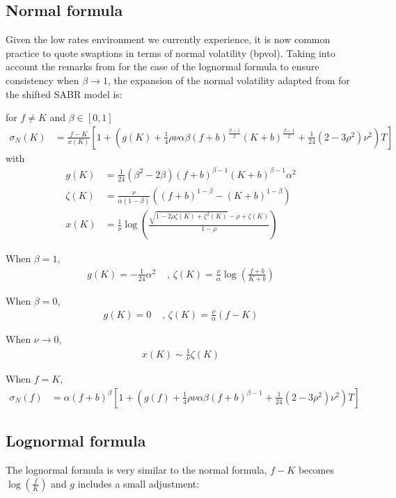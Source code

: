 \documentclass[]{rAMF2e}
\begin{document}
\subsection{Normal formula}
Given the low rates environment we currently experience, it is now common practice to quote swaptions in terms of normal volatility (bpvol). Taking into account the remarks from \citet{obloj2008fine} for the case of the lognormal formula to ensure consistency when $\beta \to 1$, the expansion of the normal volatility adapted from \citet{hagan2002managing} for the shifted SABR model is:

for $f \neq K$ and $\beta \in [0,1]$
\begin{align}
\label{eqn:normal_sabr}
\sigma_N(K) &= \frac{f-K}{x(K)}\left[1+\left(g(K)+\frac{1}{4}\rho\nu\alpha\beta(f+b)^{\frac{\beta-1}{2}}(K+b)^{\frac{\beta-1}{2}}+\frac{1}{24}(2-3\rho^2)\nu^2\right)T\right]
\end{align}
with 
\begin{align*}
g(K) &= \frac{1}{24} (\beta^2-2\beta) (f+b)^{\beta-1} (K+b)^{\beta-1} \alpha^2\\
\zeta(K) &= \frac{\nu}{\alpha (1-\beta)} \left( (f+b)^{1-\beta} - (K+b)^{1-\beta} \right)\\
x(K) &= \frac{1}{\nu}\log\left(\frac{\sqrt{1-2\rho\zeta(K)+\zeta^2(K)}-\rho+\zeta(K)}{1-\rho} \right)
\end{align*}

When $\beta = 1$,
\begin{align*}
g(K) = -\frac{1}{24}\alpha^2 &\texttt{ , } \zeta(K) = \frac{\nu}{\alpha} \log\left(\frac{f+b}{K+b}\right)
\end{align*}

When $\beta = 0$,
\begin{align*}
g(K) = 0 &\texttt{ , }\zeta(K) = \frac{\nu}{\alpha} \left(f-K\right)
\end{align*}

When $\nu \to 0$,
\begin{align*}
x(K) \sim \frac{1}{\nu}\zeta(K)
\end{align*}

When $f=K$, 
\begin{align}
\sigma_N(f) &= \alpha (f+b)^\beta \left[1+\left(g(f)+\frac{1}{4}\rho\nu\alpha\beta(f+b)^{\beta-1}+\frac{1}{24}(2-3\rho^2)\nu^2\right)T\right]
\end{align}
\subsection{Lognormal formula}
The lognormal formula is very similar to the normal formula, $f-K$ becomes $\log(\frac{f}{K})$ and $g$ includes a small adjustment:
\end{document}
